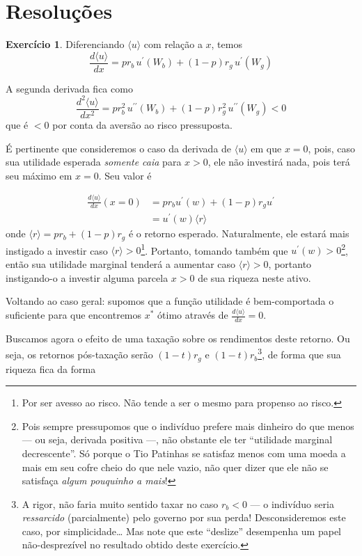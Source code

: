 \documentclass[12pt]{article}
\numberwithin{equation}{section}
\theoremstyle{plain}
\theoremstyle{definition}
\newtheorem{exercise}{Exercício}
\theoremstyle{remark}
\begin{document}
\hypertarget{resoluuxe7uxf5es}{%
\section{Resoluções}\label{resoluuxe7uxf5es}}
\setcounter{exercise}{0}
\begin{exercise}
Diferenciando \(\langle u \rangle\) com relação a \(x\), temos
\[
\frac{d\langle u \rangle}{dx} = p r_{b} \, u^\prime(W_{b}) +(1-p) r_{g} \, u^\prime(W_{g})
\]

A segunda derivada fica como
\[
\frac{d^{2}\langle u \rangle}{dx^{2}} = p r_{b}^{2} \, u^{\prime\prime}(W_{b}) +(1-p) r_{g}^{2} \, u^{\prime\prime}(W_{g}) < 0
\]
que é \(<0\) por conta da aversão ao risco pressuposta.

É pertinente que consideremos o caso da derivada de
\(\langle u \rangle\) em que \(x=0\), pois, caso sua utilidade esperada
\textit{somente caia} para \(x>0\), ele não investirá nada, pois terá
seu máximo em \(x=0\). Seu valor é

\begin{align*}
\frac{d\langle u \rangle}{dx}(x=0) &= p r_{b} u^\prime(w) + (1-p) r_{g} u^\prime \\
&= u^\prime(w) \langle r \rangle 
\end{align*} onde \(\langle r \rangle=p r_{b} + (1-p) r_{g}\) é o
retorno esperado. Naturalmente, ele estará mais instigado a investir
caso \(\langle r \rangle>0\)\footnote{Por ser avesso ao risco. Não tende
  a ser o mesmo para propenso ao risco.}. Portanto, tomando também que
\(u^\prime(w)>0\)\footnote{Pois sempre pressupomos que o indivíduo
  prefere mais dinheiro do que menos --- ou seja, derivada positiva ---,
  não obstante ele ter ``utilidade marginal decrescente''. Só porque o
  Tio Patinhas se satisfaz menos com uma moeda a mais em seu cofre cheio
  do que nele vazio, não quer dizer que ele não se satisfaça
  \textit{algum pouquinho a mais}!}, então sua utilidade marginal
tenderá a aumentar caso \(\langle r \rangle>0\), portanto instigando-o a
investir alguma parcela \(x>0\) de sua riqueza neste ativo.

Voltando ao caso geral: supomos que a função utilidade é bem-comportada
o suficiente para que encontremos \(x^*\) ótimo através de
\(\frac{d\langle u \rangle}{dx}=0\).

Buscamos agora o efeito de uma taxação sobre os rendimentos deste
retorno. Ou seja, os retornos pós-taxação serão \((1-t)r_{g}\) e
\((1-t)r_{b}\)\footnote{A rigor, não faria muito sentido taxar no caso
  \(r_{b}<0\) --- o indivíduo seria \textit{ressarcido} (parcialmente)
  pelo governo por sua perda! Desconsideremos este caso, por
  simplicidade\ldots{} Mas note que este ``deslize'' desempenha um papel
  não-desprezível no resultado obtido deste exercício.}, de forma que
sua riqueza fica da forma


\end{exercise}
\end{document}
